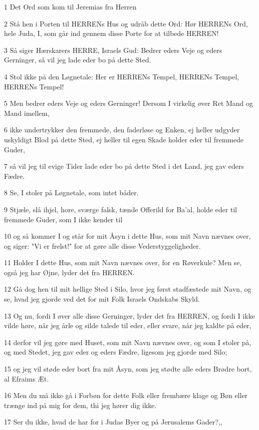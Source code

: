 \par 1 Det Ord som kom til Jeremias fra Herren
\par 2 Stå hen i Porten til HERRENs Hus og udråb dette Ord: Hør HERRENs Ord, hele Juda, I, som går ind gennem disse Porte for at tilbede HERREN!
\par 3 Så siger Hærskarers HERRE, Israels Gud: Bedrer eders Veje og eders Gerninger, så vil jeg lade eder bo på dette Sted.
\par 4 Stol ikke på den Løgnetale: Her er HERRENs Tempel, HERRENs Tempel, HERRENs Tempel!
\par 5 Men bedrer eders Veje og eders Gerninger! Dersom I virkelig øver Ret Mand og Mand imellem,
\par 6 ikke undertrykker den fremmede, den faderløse og Enken, ej heller udgyder uskyldigt Blod på dette Sted, ej heller til egen Skade holder eder til fremmede Guder,
\par 7 så vil jeg til evige Tider lade eder bo på dette Sted i det Land, jeg gav eders Fædre.
\par 8 Se, I stoler på Løgnetale, som intet båder.
\par 9 Stjæle, slå ihjel, hore, sværge falsk, tænde Offerild for Ba'al, holde eder til fremmede Guder, som I ikke kender til
\par 10 og så kommer I og står for mit Åsyn i dette Hus, som mit Navn nævnes over, og siger: "Vi er frelst!" for at gøre alle disse Vederstyggeligheder.
\par 11 Holder I dette Hus, som mit Navn nævnes over, for en Røverkule? Men se, også jeg har Øjne, lyder det fra HERREN.
\par 12 Gå dog hen til mit hellige Sted i Silo, hvor jeg først stadfæstede mit Navn, og se, hvad jeg gjorde ved det for mit Folk Israels Ondskabs Skyld.
\par 13 Og nu, fordi I øver alle disse Gerninger, lyder det fra HERREN, og fordi I ikke vilde høre, når jeg årle og silde talede til eder, eller svare, når jeg kaldte på eder,
\par 14 derfor vil jeg gøre med Huset, som mit Navn nævnes over, og som I stoler på, og med Stedet, jeg gav eder og eders Fædre, ligesom jeg gjorde med Silo;
\par 15 og jeg vil støde eder bort fra mit Åsyn, som jeg stødte alle eders Brødre bort, al Efraims Æt.
\par 16 Men du må ikke gå i Forbøn for dette Folk eller frembære klage og Bøn eller trænge ind på mig for dem, thi jeg hører dig ikke.
\par 17 Ser du ikke, hvad de har for i Judas Byer og på Jerusalems Gader?,,
